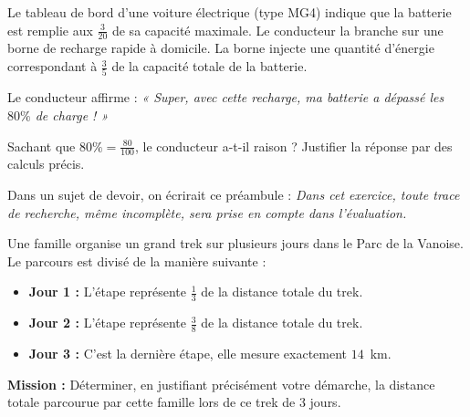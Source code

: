 \documentclass[a4paper]{book}
\begin{document}
    \begin{exercice}
        Le tableau de bord d'une voiture électrique (type MG4) indique que la batterie est remplie aux $\frac{3}{20}$ de sa capacité maximale. 
        Le conducteur la branche sur une borne de recharge rapide à domicile. La borne injecte une quantité d'énergie correspondant à $\frac{3}{5}$ de la capacité totale de la batterie.
        
        Le conducteur affirme : \textit{« Super, avec cette recharge, ma batterie a dépassé les $80\%$ de charge ! »}
        
        Sachant que $80\% = \frac{80}{100}$, le conducteur a-t-il raison ? Justifier la réponse par des calculs précis.
    \end{exercice}

    \begin{exercice}
        Dans un sujet de devoir, on écrirait ce préambule : \textit{Dans cet exercice, toute trace de recherche, même incomplète, sera prise en compte dans l'évaluation.}
        
        Une famille organise un grand trek sur plusieurs jours dans le Parc de la Vanoise. Le parcours est divisé de la manière suivante :
        \begin{itemize}
            \item \textbf{Jour 1 :} L'étape représente $\frac{1}{3}$ de la distance totale du trek.
            \item \textbf{Jour 2 :} L'étape représente $\frac{3}{8}$ de la distance totale du trek.
            \item \textbf{Jour 3 :} C'est la dernière étape, elle mesure exactement $14$~km.
        \end{itemize}
        
        \textbf{Mission :} Déterminer, en justifiant précisément votre démarche, la distance totale parcourue par cette famille lors de ce trek de 3 jours.
    \end{exercice}
\end{document}
